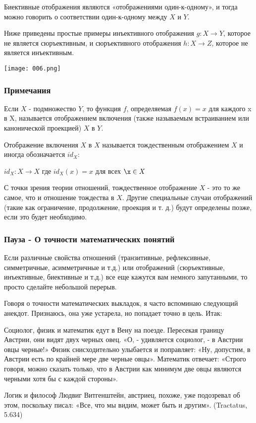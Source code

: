 Биективные отображения являются «отображениями один-к-одному», и тогда можно говорить о соответствии один-к-одному между \(X\) и \(Y\).

Ниже приведены простые примеры инъективного отображения \(g: X \rightarrow Y\), которое не является сюръективным, и сюръективного отображения \(h: X \rightarrow Z\), которое не является инъективным.
\begin{center}
  \texttt{[image: 006.png]}
\end{center}

\subsubsection{Примечания}
Если \(X\) - подмножество \(Y\), то функция \(f\), определяемая \(f(x) = x\) для каждого x в X, называется отображением включения (также называемым встраиванием или канонической проекцией) \(X\) в \(Y\).

Отображение включения \(X\) в \(X\) называется тождественным отображением \(X\) и иногда обозначается \(id_X\):

\vspace{0.5cm}
\(id_X:X \rightarrow X\) где \(id_X(x) = x\) для всех \(\x \in X\)
\vspace{0.5cm}

С точки зрения теории отношений, тождественное отображение \(X\) - это то же самое, что и отношение тождества в \(X\). Другие специальные случаи отображений (такие как ограничение, продолжение, проекция и т. д.) будут определены позже, если это будет необходимо.

\subsubsection{Пауза - О точности математических понятий}
Если различные свойства отношений (транзитивные, рефлексивные, симметричные, асимметричные и т.д.) или отображений (сюръективные, инъективные, биективные и т.д.) все еще кажутся вам немного запутанными, то просто сделайте небольшой перерыв.

Говоря о точности математических выкладок, я часто вспоминаю следующий анекдот. Признаюсь, она уже устарела, но попадает точно в цель. Итак:

Социолог, физик и математик едут в Вену на поезде. Пересекая границу Австрии, они видят двух черных овец. «О, - удивляется социолог, - в Австрии овцы черные!» Физик снисходительно улыбается и поправляет: «Ну, допустим, в Австрии есть по крайней мере две черные овцы». Математик отвечает: «Строго говоря, можно сказать только, что в Австрии как минимум две овцы являются черными хотя бы с каждой стороны».

Логик и философ Людвиг Витгенштейн, австриец, похоже, уже подозревал об этом, поскольку писал: «Все, что мы видим, может быть и другим». (Tractatus, 5.634)
